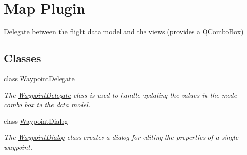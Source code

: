\hypertarget{group___path_planner}{\section{\-Map \-Plugin}
\label{group___path_planner}
}


\-Delegate between the flight data model and the views (provides a \-Q\-Combo\-Box)  


\subsection*{\-Classes}
\begin{DoxyCompactItemize}
\item 
class \hyperlink{class_waypoint_delegate}{\-Waypoint\-Delegate}
\begin{DoxyCompactList}\small\item\em \-The \hyperlink{class_waypoint_delegate}{\-Waypoint\-Delegate} class is used to handle updating the values in the mode combo box to the data model. \end{DoxyCompactList}\item 
class \hyperlink{class_waypoint_dialog}{\-Waypoint\-Dialog}
\begin{DoxyCompactList}\small\item\em \-The \hyperlink{class_waypoint_dialog}{\-Waypoint\-Dialog} class creates a dialog for editing the properties of a single waypoint. \end{DoxyCompactList}\end{DoxyCompactItemize}
